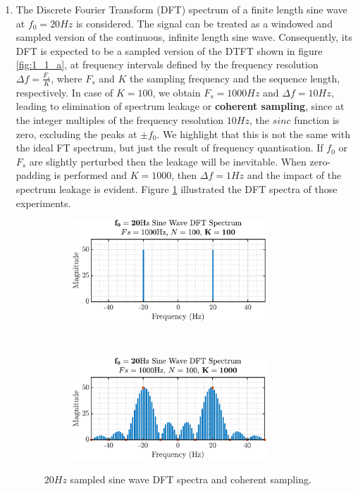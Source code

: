 \begin{enumerate}[label=\alph*), leftmargin=*]
\item
%
The Discrete Fourier Transform (DFT) spectrum of a finite length sine wave at $f_{0}=20Hz$ is considered. The signal can be treated as
a windowed and sampled version of the continuous, infinite length sine wave. Consequently, its DFT is expected to be a sampled version of the DTFT shown
in figure \ref{fig:1_1_a}, at frequency intervals defined by the frequency resolution $\Delta f = \frac{F_{s}}{K}$, where $F_{s}$ and $K$ the sampling frequency
and the sequence length, respectively. In case of $K=100$, we obtain $F_{s}=1000Hz$ and $\Delta f = 10Hz$, leading to elimination of spectrum leakage or
\textbf{coherent sampling}, since at the integer multiples of the frequency resolution $10Hz$, the $sinc$ function is zero, excluding the peaks at $\pm f_{0}$.
We highlight that this is not the same with the ideal FT spectrum, but just the result of frequency quantisation. If $f_{0}$ or $F_{s}$ are slightly perturbed
then the leakage will be inevitable. When zero-padding is performed and $K=1000$, then $\Delta f = 1Hz$ and the impact of the spectrum leakage is evident.
Figure \ref{fig:1_1_b} illustrated the DFT spectra of those experiments.
%
\begin{figure}[H]
    \centering
    \begin{subfigure}{0.49\textwidth}
        \centering
        \includegraphics[height=1.5in]{report/spectrum-estimation/discete-fourier-transform-basics/assets/b/dft-f0_20-K_100}
    \end{subfigure}
    ~ 
    \begin{subfigure}{0.49\textwidth}
        \centering
        \includegraphics[height=1.5in]{report/spectrum-estimation/discete-fourier-transform-basics/assets/b/dft-f0_20-K_1000}
    \end{subfigure}
    \caption{$20Hz$ sampled sine wave DFT spectra and coherent sampling.}
    \label{fig:1_1_b}
\end{figure}



\end{enumerate}
